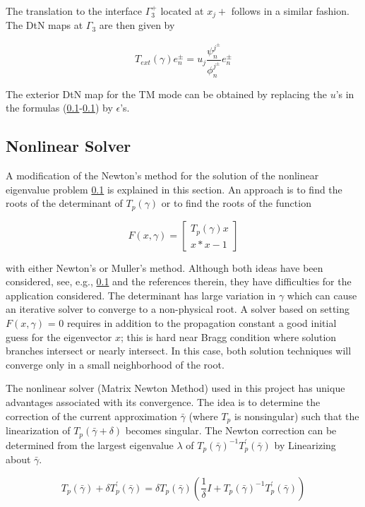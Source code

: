 The translation to the interface $\Gamma_3^+$ located at $x_j+$
follows in a similar fashion. The DtN maps at $\Gamma_3$ are then
given by 

\begin{equation}
T_{ext}(\gamma) e_n^\pm = u_j \frac{\psi_n^{j^\pm}}{\phi_n^{j^\pm}} e_n^\pm
\end{equation}

The exterior DtN map for the TM mode can be obtained by replacing the
$u$'s in the formulas (\ref{}-\ref{}) by $\epsilon$'s.

\subsection{Nonlinear Solver}
A modification of the Newton's method for the solution of the
nonlinear eigenvalue problem \ref{} is explained in this section. An
approach is to find the roots of the determinant of $T_p(\gamma)$ or
to find the roots of the function

\begin{equation}
F(x,\gamma) = \left[ \begin{array}{cc} T_p(\gamma)x \\
x*x-1 \end{array} \right]
\end{equation}

with either Newton's or Muller's method. Although both ideas have been
considered, see, e.g., \ref{} and the references therein, they have
difficulties for the application considered. The determinant has large
variation in $\gamma$ which can cause an iterative solver to converge
to a non-physical root. A solver based on setting $F(x,\gamma)$ = 0
requires in addition to the propagation constant a good initial guess
for the eigenvector $x$; this is hard near Bragg condition where
solution branches intersect or nearly intersect. In this case, both
solution techniques will converge only in a small neighborhood of the
root.

The nonlinear solver (Matrix Newton Method) used in this project has
unique advantages associated with its convergence. The idea is to
determine the correction of the current approximation $\bar{\gamma}$
(where $T _p$ is nonsingular) such that the linearization of
$T_p(\bar{\gamma}+\delta)$ becomes singular. The Newton correction can
be determined from the largest eigenvalue $\lambda$ of
$T_p(\bar{\gamma})^{-1} T_p^\prime (\bar{\gamma})$ by Linearizing about
$\bar{\gamma}$.

\begin{equation}
T_p(\bar{\gamma})+\delta T_p^\prime (\bar{\gamma}) = \delta T_p(\bar{\gamma})
(\frac{1}{\delta} I + T_p(\bar{\gamma})^{-1} T_p^\prime (\bar{\gamma}))
\end{equation}

